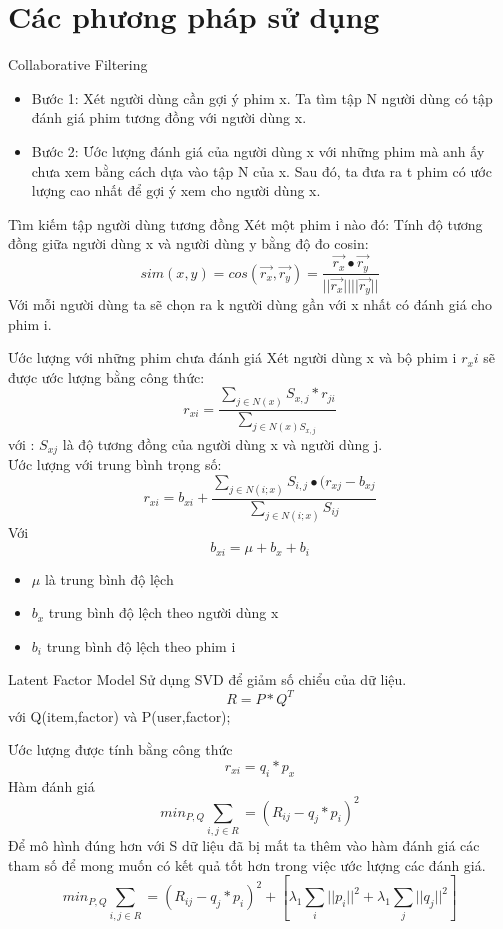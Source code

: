 \documentclass{beamer}
\begin{document}
\section{Các phương pháp sử dụng}

\begin{frame}{Collaborative Filtering}
\color{vhilight}{ Ý tưởng :}
\begin{itemize}
\item Bước 1: Xét người dùng cần gợi ý phim x. Ta tìm tập N người dùng có tập đánh giá phim tương đồng với người dùng x. 
\item Bước 2: Ước lượng đánh giá của người dùng x với những phim mà anh ấy chưa xem bằng cách dựa vào tập N của x. Sau đó, ta đưa ra t phim có ước lượng cao nhất để gợi ý xem cho người dùng x.
\end{itemize} 
\end{frame}
\begin{frame}{Tìm kiếm tập người dùng tương đồng}
Xét một phim i nào đó:
Tính độ tương đồng giữa người dùng x và người dùng y bằng độ đo cosin:
$$sim(x,y)=cos(\overrightarrow{r_x},\overrightarrow{r_y})=\dfrac{\overrightarrow{r_x}\bullet\overrightarrow{r_y}}{||\overrightarrow{r_x}||||\overrightarrow{r_y}||}$$
Với mỗi người dùng ta sẽ chọn ra k người dùng gần với x nhất có đánh giá cho phim i. 
\end{frame}
\begin{frame}{Ước lượng với những phim chưa đánh giá}
Xét người dùng x và bộ phim i $r_xi$ sẽ được ước lượng bằng công thức: 
$$ r_{xi}=\dfrac{\sum_{j\in N(x)} S_{x,j} *r_{ji}}{\sum_{j\in N(x) S_{x,j}}}$$
với : $ S_{xj} $ là độ tương đồng của người dùng x và người dùng j.\\

Ước lượng với trung bình trọng số:
$$r_{xi}=b_{xi}+\dfrac{\sum_{j\in N(i;x)} S_{i,j} \bullet (r_{xj} -b_{xj} }{\sum_{j\in N(i;x)} S_{ij} }$$
Với $$b_{xi}= \mu + b_x + b_i $$ 
\begin{itemize}
\item $\mu$ là trung bình độ lệch 
\item $b_x$ trung bình độ lệch theo người dùng x
\item $b_i$ trung bình độ lệch theo phim i
\end{itemize}

\end{frame}
\begin{frame}{Latent Factor Model}
{\color{vhilight}{ Ý tưởng :}} 
Sử dụng SVD để giảm số chiểu của dữ liệu.
$$R=P*Q^T$$
với Q(item,factor) và P(user,factor);


Ước lượng được tính bằng công thức $$r_{xi}=q_i*p_x$$ 
Hàm đánh giá $$ min_{P,Q} \sum_{i,j\in R} = (R_{ij}-q_j*p_i)^2$$
Để mô hình đúng hơn với S dữ liệu đã bị mất ta thêm vào hàm đánh giá các tham số để mong muốn có kết quả tốt hơn trong việc ước lượng các đánh giá.
$$ min_{P,Q} \sum_{i,j\in R} = (R_{ij}-q_j*p_i)^2+[\lambda_1 \sum_i ||p_i||^2 +\lambda_1 \sum_j ||q_j||^2]$$

\end{frame}
\end{document}
